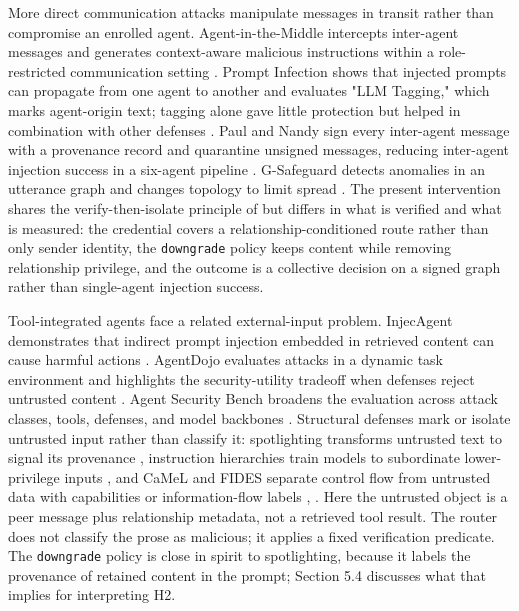 \documentclass[11pt]{article}
\begin{document}
More direct communication attacks manipulate messages in transit rather than compromise an enrolled agent. Agent-in-the-Middle intercepts inter-agent messages and generates context-aware malicious instructions within a role-restricted communication setting \cite{he2025redteaming}. Prompt Infection shows that injected prompts can propagate from one agent to another and evaluates "LLM Tagging," which marks agent-origin text; tagging alone gave little protection but helped in combination with other defenses \cite{lee2024promptinfection}. Paul and Nandy sign every inter-agent message with a provenance record and quarantine unsigned messages, reducing inter-agent injection success in a six-agent pipeline \cite{paul2026beyond}. G-Safeguard detects anomalies in an utterance graph and changes topology to limit spread \cite{wang2025gsafeguard}. The present intervention shares the verify-then-isolate principle of \cite{paul2026beyond} but differs in what is verified and what is measured: the credential covers a relationship-conditioned route rather than only sender identity, the \texttt{downgrade} policy keeps content while removing relationship privilege, and the outcome is a collective decision on a signed graph rather than single-agent injection success.

Tool-integrated agents face a related external-input problem. InjecAgent demonstrates that indirect prompt injection embedded in retrieved content can cause harmful actions \cite{zhan2024injecagent}. AgentDojo evaluates attacks in a dynamic task environment and highlights the security-utility tradeoff when defenses reject untrusted content \cite{debenedetti2024agentdojo}. Agent Security Bench broadens the evaluation across attack classes, tools, defenses, and model backbones \cite{zhang2025asb}. Structural defenses mark or isolate untrusted input rather than classify it: spotlighting transforms untrusted text to signal its provenance \cite{hines2024spotlighting}, instruction hierarchies train models to subordinate lower-privilege inputs \cite{wallace2024hierarchy}, and CaMeL and FIDES separate control flow from untrusted data with capabilities or information-flow labels \cite{debenedetti2025camel}, \cite{costa2025fides}. Here the untrusted object is a peer message plus relationship metadata, not a retrieved tool result. The router does not classify the prose as malicious; it applies a fixed verification predicate. The \texttt{downgrade} policy is close in spirit to spotlighting, because it labels the provenance of retained content in the prompt; Section 5.4 discusses what that implies for interpreting H2.
\end{document}
